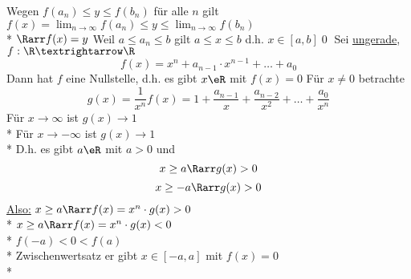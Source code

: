 	Wegen $f(a_n) \leq y \leq f(b_n)$ für alle $n$ gilt $f(x) = \lim_{n \to \infty} f(a_n) \leq y \leq \lim_{n \to \infty} f(b_n)$\\*
	$\Rarr f(x) = y$ 
%
\bem
Weil $a\leq a_n\leq b$ gilt $a\leq x\leq b$ d.h. $x\in[a,b]$\qed
{}
Sei \nN{} \ul{ungerade}, $f:\R→\R$
$$f(x)=x^n+a_{n-1}·x^{n-1}+…+a_0$$
Dann hat $f$ eine Nullstelle, d.h. es gibt $x\eR$ mit $f(x)=0$
\bew
Für $x\neq 0$ betrachte
$$g(x)=\frac{1}{x^n}f(x)=1+\frac{a_{n-1}}{x}+\frac{a_{n-2}}{x^2}+…+\frac{a_0}{x^n}$$
Für $x→∞$ ist $g(x)→1$\\*
Für $x→-∞$ ist $g(x)→1$\\*
D.h. es gibt $a\eR$ mit $a>0$ und
$$x\geq a \Rarr g(x)>0$$
$$x\geq -a \Rarr g(x)>0$$
%
\ul{Also:} $x \geq a \Rarr f(x) = x^n \cdot g(x) > 0$\\*
	$x \geq a \Rarr f(x) = x^n \cdot g(x) < 0$\\* %
	$f(-a) < 0 < f(a)$\\*
	Zwischenwertsatz \Rarr er gibt $x \in [-a, a]$ mit $f(x) = 0$\\*

